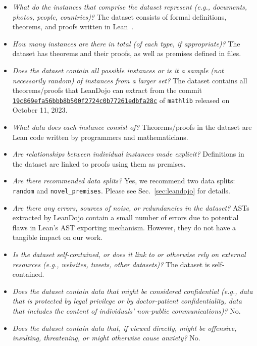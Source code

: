 \begin{itemize}
\item \emph{What do the instances that comprise the dataset represent (e.g., documents, photos, people, countries)?} The dataset consists of formal definitions, theorems, and proofs written in Lean~\cite{de2015lean}.

\item \emph{How many instances are there in total (of each type, if appropriate)?} The dataset has {\numproofs} theorems and their proofs, as well as {\numpremises} premises defined in {\numfiles} files.

\item \emph{Does the dataset contain all possible instances or is it a sample (not necessarily random) of instances from a larger set?} The dataset contains all theorems/proofs that LeanDojo can extract from the commit \href{https://github.com/leanprover-community/mathlib/tree/19c869efa56bbb8b500f2724c0b77261edbfa28c}{\texttt{19c869efa56bbb8b500f2724c0b77261edbfa28c}} of \texttt{mathlib} released on October 11, 2023.

\item \emph{What data does each instance consist of?} Theorems/proofs in the dataset are Lean code written by programmers and mathematicians.

\item \emph{Are relationships between individual instances made explicit?} Definitions in the dataset are linked to proofs using them as premises.

\item \emph{Are there recommended data splits?} Yes, we recommend two data splits: \texttt{random} and \texttt{novel\_premises}. 
Please see Sec.~\ref{sec:leandojo} for details.

\item \emph{Are there any errors, sources of noise, or redundancies in the dataset?} ASTs extracted by LeanDojo contain a small number of errors due to potential flaws in Lean's AST exporting mechanism. However, they do not have a tangible impact on our work.

\item \emph{Is the dataset self-contained, or does it link to or otherwise rely on external resources (e.g., websites, tweets, other datasets)?} The dataset is self-contained.

\item \emph{Does the dataset contain data that might be considered confidential (e.g., data that is protected by legal privilege or by doctor-patient confidentiality, data that includes the content of individuals’ non-public communications)?} No.

\item \emph{Does the dataset contain data that, if viewed directly, might be offensive, insulting, threatening, or might otherwise cause anxiety?} No.

\end{itemize}



